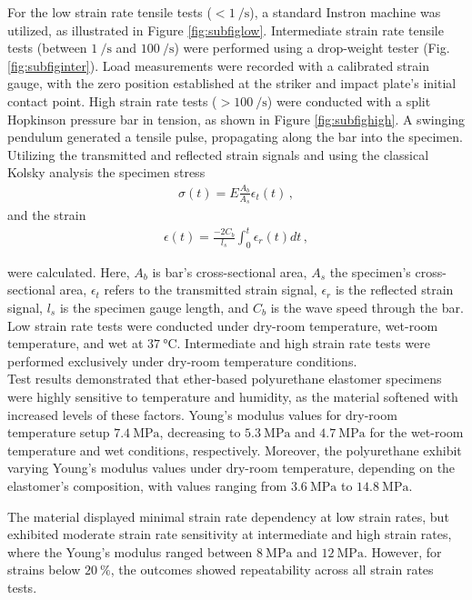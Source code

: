 For the low strain rate tensile tests ($< \SI[per-mode = symbol]{1}{\per \second}$), a standard Instron machine was utilized, as illustrated in Figure 
\ref{fig:subfiglow}. Intermediate strain rate tensile tests (between $\SI[per-mode = symbol]{1}{\per \second}$ and $\SI[per-mode = symbol]{100}{\per \second}$) 
were performed using a drop-weight tester (Fig. \ref{fig:subfiginter}). Load measurements were recorded with a calibrated strain gauge, 
with the zero position established at the striker and impact plate's initial contact point.
High strain rate tests ($>\SI[per-mode = symbol]{100}{\per \second}$) were conducted with a split Hopkinson pressure bar in tension, as shown in Figure \ref{fig:subfighigh}.
A swinging pendulum generated a tensile pulse, propagating along the bar into the specimen. Utilizing 
the transmitted and reflected strain signals and using the classical Kolsky analysis the specimen stress
\begin{align}
        \sigma(t) = E\frac{A_b}{A_s}\epsilon_t(t) \, ,
\end{align}
and the strain
\begin{align}
        \epsilon(t) = \frac{-2C_b}{l_s} \int_{0}^{t} \epsilon_r(t) dt \, ,
\end{align}

were calculated. Here, $A_b$ is bar's cross-sectional area, $A_s$ the specimen's cross-sectional area,
$\epsilon_t$ refers to the transmitted strain signal, $\epsilon_r$ is the reflected strain signal,
$l_s$ is the specimen gauge length, and $C_b$ is the wave speed through the bar.
Low strain rate tests were conducted under dry-room temperature, wet-room temperature, and wet at $\SI{37}{\degreeCelsius}$. 
Intermediate and high strain rate tests were performed exclusively under dry-room temperature conditions.\\

Test results demonstrated that ether-based polyurethane elastomer specimens were highly sensitive to 
temperature and humidity, as the material softened with increased levels of these factors. Young's 
modulus values for dry-room temperature setup $\SI{7.4}{\mega \pascal}$, decreasing to $\SI{5.3}{\mega \pascal}$ 
and $\SI{4.7}{\mega \pascal}$ for the wet-room temperature and wet conditions, respectively.
Moreover, the polyurethane exhibit varying Young's modulus values under dry-room temperature, depending 
on the elastomer's composition, with values ranging from $\SI{3.6}{\mega \pascal}$ to $\SI{14.8}{\mega \pascal}$.

The material displayed minimal strain rate dependency at low strain rates, but exhibited moderate 
strain rate sensitivity at intermediate and high strain rates, where the Young's modulus ranged between 
$\SI{8}{\mega \pascal}$ and $\SI{12}{\mega \pascal}$. However, for strains below $\SI{20}{\percent}$, the 
outcomes showed repeatability across all strain rates tests. 

